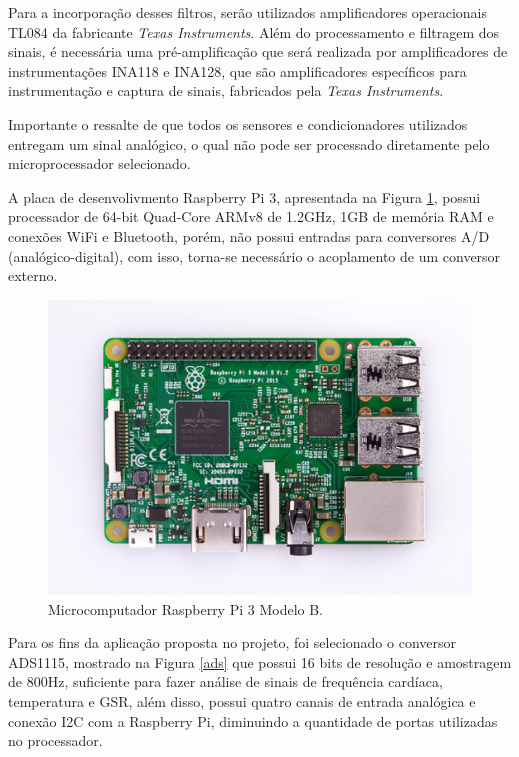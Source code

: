 Para a incorporação desses filtros, serão utilizados amplificadores operacionais 
TL084 da fabricante \textit{Texas Instruments}. Além do processamento e filtragem 
dos sinais, é necessária uma pré-amplificação que será realizada por amplificadores 
de instrumentações INA118 e INA128, que são amplificadores específicos 
para instrumentação e captura de sinais, fabricados pela \textit{Texas Instruments}.

Importante o ressalte de que todos os sensores e condicionadores utilizados
entregam um sinal analógico, o qual não pode ser processado diretamente
pelo microprocessador selecionado.

A placa de desenvolivmento Raspberry Pi 3, apresentada na Figura \ref{fig:rasp}, 
possui processador de 64-bit Quad-Core ARMv8 de 1.2GHz, 1GB de memória RAM e 
conexões WiFi e Bluetooth, porém, não possui 
entradas para 
conversores A/D (analógico-digital), com isso, torna-se necessário o acoplamento de um conversor externo.

\begin{figure}[H]
  \centering
    \includegraphics[keepaspectratio=true,scale=0.6]{figuras/rasp.eps}
  \caption{Microcomputador Raspberry Pi 3 Modelo B.}
  \label{fig:rasp}
\end{figure}

Para os fins da aplicação proposta no projeto, foi selecionado o conversor 
ADS1115, mostrado na Figura \ref{ads} que possui 16 bits de resolução e amostragem 
de 800Hz, suficiente para fazer análise de sinais de frequência cardíaca, 
temperatura e GSR, além disso, possui quatro canais de entrada analógica e 
conexão I2C com a Raspberry Pi, diminuindo a quantidade de portas utilizadas no processador. 


